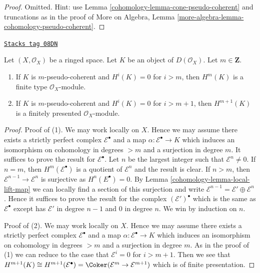 \begin{proof}

Omitted. Hint: use Lemma \ref{cohomology-lemma-cone-pseudo-coherent} and truncations
as in the proof of
More on Algebra, Lemma \ref{more-algebra-lemma-cohomology-pseudo-coherent}.
\end{proof}

\begin{lemma}
\label{cohomology-lemma-finite-cohomology}
\href{https://stacks.math.columbia.edu/tag/08DN}{\texttt{Stacks tag 08DN}}

Let $(X, \mathcal{O}_X)$ be a ringed space.
Let $K$ be an object of $D(\mathcal{O}_X)$.
Let $m \in \mathbf{Z}$.
\begin{enumerate}
\item If $K$ is $m$-pseudo-coherent and $H^i(K) = 0$
for $i > m$, then $H^m(K)$ is a finite type $\mathcal{O}_X$-module.
\item If $K$ is $m$-pseudo-coherent and $H^i(K) = 0$
for $i > m + 1$, then $H^{m + 1}(K)$ is a finitely presented
$\mathcal{O}_X$-module.
\end{enumerate}
\end{lemma}

\begin{proof}

Proof of (1). We may work locally on $X$. Hence we may assume there exists
a strictly perfect complex $\mathcal{E}^\bullet$ and a map
$\alpha : \mathcal{E}^\bullet \to K$ which induces
an isomorphism on cohomology in degrees $> m$ and a surjection in degree $m$.
It suffices to prove the result for $\mathcal{E}^\bullet$.
Let $n$ be the largest integer such that $\mathcal{E}^n \not = 0$.
If $n = m$, then $H^m(\mathcal{E}^\bullet)$ is a quotient of
$\mathcal{E}^n$ and the result is clear.
If $n > m$, then $\mathcal{E}^{n - 1} \to \mathcal{E}^n$ is surjective as
$H^n(E^\bullet) = 0$. By Lemma \ref{cohomology-lemma-local-lift-map}
we can locally find a section of this surjection and write
$\mathcal{E}^{n - 1} = \mathcal{E}' \oplus \mathcal{E}^n$.
Hence it suffices to prove the result for the complex
$(\mathcal{E}')^\bullet$ which is the same as $\mathcal{E}^\bullet$
except has $\mathcal{E}'$ in degree $n - 1$ and $0$ in degree $n$.
We win by induction on $n$.

\medskip\noindent
Proof of (2). We may work locally on $X$. Hence we may assume there exists
a strictly perfect complex $\mathcal{E}^\bullet$ and a map
$\alpha : \mathcal{E}^\bullet \to K$ which induces
an isomorphism on cohomology in degrees $> m$ and a surjection in degree $m$.
As in the proof of (1) we can reduce to the case that $\mathcal{E}^i = 0$
for $i > m + 1$. Then we see that
$H^{m + 1}(K) \cong H^{m + 1}(\mathcal{E}^\bullet) =
\Coker(\mathcal{E}^m \to \mathcal{E}^{m + 1})$
which is of finite presentation.
\end{proof}

